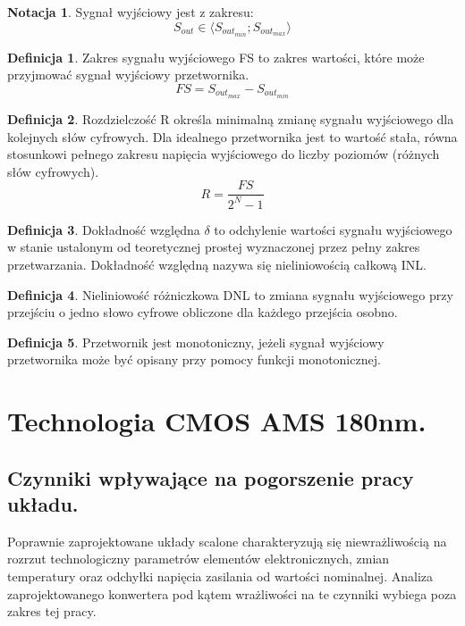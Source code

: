 \documentclass[10pt,a4paper]{report}
\theoremstyle{definition}
\newtheorem{notation}{Notacja}[section]
\theoremstyle{definition}
\newtheorem{definition}{Definicja}[section]
\theoremstyle{definition}
\theoremstyle{definition}
\theoremstyle{definition}
\begin{document}
	\begin{notation}{Sygnał wyjściowy jest z zakresu:}
		$$
			S_{out} \in \langle S_{out_{min}} ;  S_{out_{max}} \rangle
		$$
	\end{notation}

	\begin{definition}{Zakres sygnału wyjściowego FS to zakres wartości, które może przyjmować sygnał wyjściowy przetwornika.}
		\begin{equation}
			FS = S_{out_{max}} - S_{out_{min}}
		\end{equation}
	\end{definition}

	\begin{definition}{Rozdzielczość R określa minimalną zmianę sygnału wyjściowego dla kolejnych słów cyfrowych. Dla idealnego przetwornika jest to wartość stała, równa stosunkowi pełnego zakresu napięcia wyjściowego do liczby poziomów (różnych słów cyfrowych). }
		\begin{equation}
			R = \frac{FS}{2^{N}-1}		
		\end{equation}
	\end{definition}
		
	\begin{definition}{Dokładność względna $\delta$ to odchylenie wartości sygnału wyjściowego w stanie ustalonym od teoretycznej prostej wyznaczonej przez pełny zakres przetwarzania. Dokładność względną nazywa się nieliniowością całkową INL.}	
	\end{definition}
		
	\begin{definition}{Nieliniowość różniczkowa DNL to zmiana sygnału wyjściowego przy przejściu o jedno słowo cyfrowe obliczone dla każdego przejścia osobno. }
	\end{definition}	
	
	\begin{definition}{Przetwornik jest monotoniczny, jeżeli sygnał wyjściowy przetwornika może być opisany przy pomocy funkcji monotonicznej.}
	\end{definition}

	\chapter{Technologia CMOS AMS 180nm.}
	\section{Czynniki wpływające na pogorszenie pracy układu.}
	{	Poprawnie zaprojektowane układy scalone charakteryzują się niewrażliwością na rozrzut technologiczny parametrów elementów elektronicznych, zmian temperatury oraz odchyłki napięcia zasilania od wartości nominalnej. Analiza zaprojektowanego konwertera pod kątem wrażliwości na te czynniki wybiega poza zakres tej pracy. }
\end{document}
